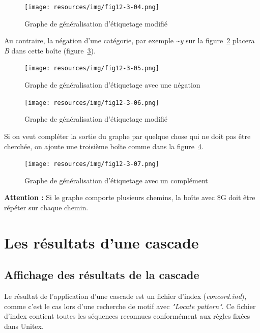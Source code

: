 \begin{figure}[!htb]
  \centering
  \texttt{[image: resources/img/fig12-3-04.png]}
  \caption{Graphe de g\'{e}n\'{e}ralisation d'\'{e}tiquetage modifi\'{e}}
  \label{fig12-3-04}
\end{figure}

\noindent Au contraire, la n\'{e}gation d'une cat\'{e}gorie, par exemple \textit{\textasciitilde y} sur la figure~\ref{fig12-3-05} placera \textit{B} dans cette bo\^{i}te (figure~\ref{fig12-3-06}).
\begin{figure}[!htb]
  \centering
  \texttt{[image: resources/img/fig12-3-05.png]}
  \caption{Graphe de g\'{e}n\'{e}ralisation d'\'{e}tiquetage avec une n\'{e}gation}
  \label{fig12-3-05}
\end{figure}

\begin{figure}[!htb]
  \centering
  \texttt{[image: resources/img/fig12-3-06.png]}
  \caption{Graphe de g\'{e}n\'{e}ralisation d'\'{e}tiquetage modifi\'{e}}
  \label{fig12-3-06}
\end{figure}

Si on veut compl\'{e}ter la sortie du graphe par quelque chose qui ne doit pas \^{e}tre cherch\'{e}e, on ajoute une troisi\`{e}me bo\^{i}te comme dans la figure~\ref{fig12-3-07}.
\begin{figure}[!htb]
  \centering
  \texttt{[image: resources/img/fig12-3-07.png]}
  \caption{Graphe de g\'{e}n\'{e}ralisation d'\'{e}tiquetage avec un compl\'{e}ment}
  \label{fig12-3-07}
\end{figure}

\large{\textbf{Attention :}}  Si le graphe comporte plusieurs chemins, la bo\^{i}te avec \$G doit être répéter sur chaque chemin.

\section{Les résultats d'une cascade}

\subsection{Affichage des résultats de la cascade}
\label{subsec:resultsCascade}

Le résultat de l'application d'une cascade est un fichier d'index (\textit{concord.ind}), comme c'est le cas
lors d'une recherche de motif avec \textit{"Locate pattern"}. Ce fichier d'index contient toutes les séquences
reconnues conformément aux règles fixées dans Unitex.

